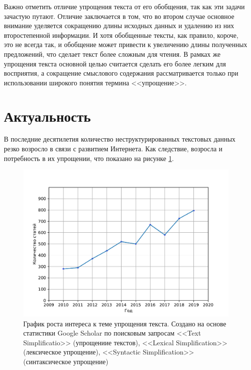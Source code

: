 Важно отметить отличие упрощения текста от его обобщения, так как эти задачи зачастую путают. Отличие заключается в том, что во втором случае основное внимание уделяется сокращению длины исходных данных и удалению из них второстепенной информации. И хотя обобщенные тексты, как правило, короче, это не всегда так, и обобщение может привести к увеличению длины полученных предложений\cite{shardlow_survey_2014}, что сделает текст более сложным для чтения. В рамках же упрощения текста основной целью считается сделать его более легким для восприятия, а сокращение смыслового содержания рассматривается только при использовании широкого понятия термина <<упрощение>>.

\section{Актуальность}
В последние десятилетия количество неструктурированных текстовых данных резко возросло в связи с развитием Интернета. Как следствие, возросла и потребность в их упрощении, что показано на рисунке \ref{fig:growth_of_interest}. 


\clearpage

\begin{figure}[h!]
	\begin{center}
		\includegraphics[pages=-, scale=0.9]{./inc/img/graph.pdf}
		\caption{График роста интереса к теме упрощения текста. Создано на основе статистики Google Scholar по поисковым запросам <<Text Simplificatio>> (упрощениие текстов),  <<Lexical Simplification>> (лексическое упрощение), <<Syntactic Simplification>> (синтаксическое упрощение)\cite{sikka_survey_2020}}  
		\label{fig:growth_of_interest}
	\end{center}
\end{figure}


